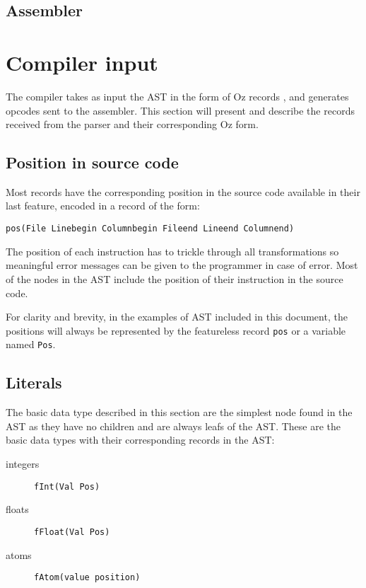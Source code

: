 \documentclass[a4paper]{memoir}
\begin{document}
\subsection{Assembler}














\section{Compiler input}\label{section:compilerinput}
The compiler takes as input the AST in the form of Oz records \cite{AST}, and generates opcodes sent to the assembler. 
This section will present and describe the records received from the parser and
their corresponding Oz form.
\subsection{Position in source code}
Most records have the corresponding position in the source code available in
their last feature, encoded in a record of the form:
\begin{lstlisting}
pos(File Linebegin Columnbegin Fileend Lineend Columnend)
\end{lstlisting}
The position of each instruction has to trickle through all transformations so meaningful error messages can be given to the programmer in case of error.
Most of the nodes in the AST include the position of their instruction in the
source code.

For clarity and brevity, in the examples of AST included in this document, the
positions will always be represented by the featureless record \lstinline!pos!
or a variable named \lstinline!Pos!. 
\subsection{Literals}
The basic data type described in this section are the simplest node found in the AST as they have no children and are always leafs of the AST.
These are the basic data types with their corresponding records in the AST:
\begin{description}
  \item[integers] \lstinline!fInt(Val Pos)!
  \item[floats] \lstinline!fFloat(Val Pos)!
  \item[atoms] \lstinline!fAtom(value position)!
\end{description}
\end{document}
